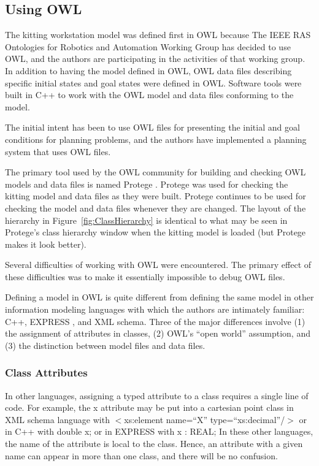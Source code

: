 \subsection{Using OWL}

The kitting workstation model was defined first in OWL because The IEEE RAS
Ontologies for Robotics and Automation Working Group has decided to use
OWL, and the authors are participating in the activities of that working
group. In addition to having the model defined in OWL, OWL data files
describing specific initial states and goal states were defined in OWL.
Software tools were built in C++ to work with the OWL model and data
files conforming to the model.

The initial intent has been to use OWL files for presenting the initial and
goal conditions for planning problems, and the authors have implemented a
planning system that uses OWL files.

The primary tool used by the OWL community for building and checking OWL
models and data files is named Protege \cite{Horridge.2011}. Protege was
used for checking the kitting model and data files as they were
built. Protege continues to be used for checking the model and data files
whenever they are changed. The layout of the hierarchy in
Figure~\ref{fig:ClassHierarchy} is identical to what may be seen in
Protege's class hierarchy window when the kitting model is loaded (but
Protege makes it look better).

Several difficulties of working with OWL were encountered. The primary
effect of these difficulties was to make it essentially impossible to
debug OWL files.

Defining a model in OWL is quite different from defining the same model in
other information modeling languages with which the authors are intimately
familiar: C++, EXPRESS \cite{EXPRESSmanual}, and XML schema. Three of the
major differences involve (1) the assignment of attributes in classes, (2)
OWL's ``open world'' assumption, and (3) the distinction between model
files and data files.\\

\subsubsection{Class Attributes}

In other languages, assigning a typed attribute to a class requires a
single line of code. For example, the x attribute may be put into a
cartesian point class in XML schema language with
\newline \sf $<$xs:element name=``X'' type=``xs:decimal''/$>$\rm
\newline or in C++ with
\newline \sf double x; \rm
\newline or in EXPRESS with
\newline \sf x : REAL; \rm \newline
In these other languages, the name of the attribute is local to the class.
Hence, an attribute with a given name can appear in more than one class, and
there will be no confusion.

